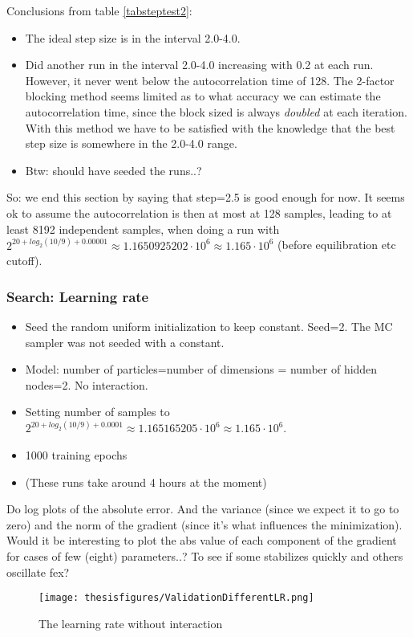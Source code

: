 \documentclass[twoside,english]{uiofysmaster}
\begin{document}
Conclusions from table \ref{tabsteptest2}:
\begin{itemize}
	\item The ideal step size is in the interval 2.0-4.0. 
	\item Did another run in the interval 2.0-4.0 increasing with 0.2 at each run. However, it never went below the autocorrelation time of 128. The 2-factor blocking method seems limited as to what accuracy we can estimate the autocorrelation time, since the block sized is always \textit{doubled} at each iteration. With this method we have to be satisfied with the knowledge that the best step size is somewhere in the 2.0-4.0 range.
	\item Btw: should have seeded the runs..?
\end{itemize}

So: we end this section by saying that step=2.5 is good enough for now. It seems ok to assume the autocorrelation is then at most at 128 samples, leading to at least 8192 independent samples, when doing a run with $2^{20 + log_2 (10/9) + 0.00001} \approx 1.1650925202\cdot 10^6 \approx 1.165 \cdot 10^6$ (before equilibration etc cutoff).

\subsubsection{Search: Learning rate}
\begin{itemize}
	\item Seed the random uniform initialization to keep constant. Seed=2. The MC sampler was not seeded with a constant.
	\item Model: number of particles=number of dimensions = number of hidden nodes=2. No interaction.
	\item Setting number of samples to $2^{20 + log_2 (10/9) + 0.0001} \approx 1.165165205\cdot 10^6 \approx 1.165 \cdot 10^6$.
	\item 1000 training epochs
	\item (These runs take around 4 hours at the moment)
\end{itemize}

Do log plots of the absolute error. And the variance (since we expect it to go to zero) and the norm of the gradient (since it's what influences the minimization). Would it be interesting to plot the abs value of each component of the gradient for cases of few (eight) parameters..? To see if some stabilizes quickly and others oscillate fex?

\begin{figure}
\centering
 \texttt{[image: thesisfigures/ValidationDifferentLR.png]}
 \caption{The learning rate without interaction}
 \label{fig:ValidationDifferentLR}
\end{figure}
\end{document}
